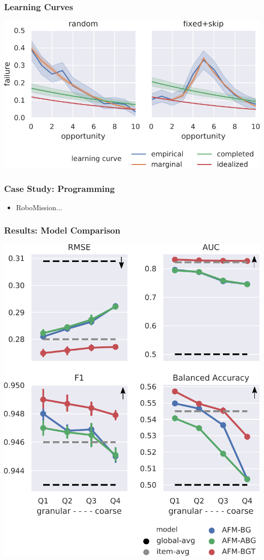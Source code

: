 \documentclass[bigger]{beamer}
\begin{document}
\begin{frame}
  \frametitle{Learning Curves}

  \includegraphics[width=\linewidth]{learning-curves-simulated-true-model}

\end{frame}

\begin{frame}
  \frametitle{Case Study: Programming}

  \begin{itemize}
  \item RoboMission...
  \end{itemize}

\end{frame}

\begin{frame}
  \frametitle{Results: Model Comparison}

  \begin{center}
    \includegraphics[width=.5\linewidth]{programming-metrics}
  \end{center}
\end{frame}
\end{document}

